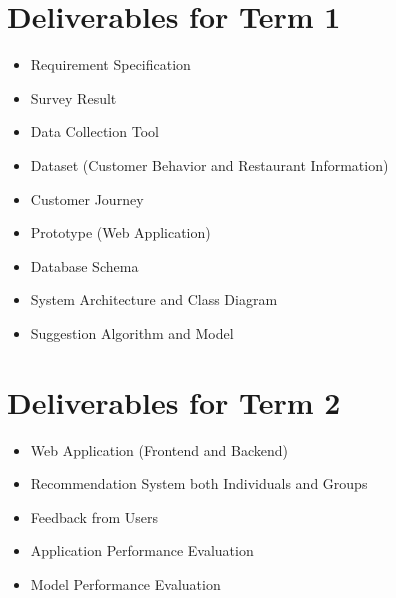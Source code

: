 \documentclass[12pt,oneside,openright,a4paper]{cpe-english-project}
\begin{document}
\newpage

\section{Deliverables for Term 1} 
\begin{itemize}
\item Requirement Specification
\item Survey Result
\item Data Collection Tool
\item Dataset (Customer Behavior and Restaurant Information)
\item Customer Journey
\item Prototype (Web Application)
\item Database Schema
\item System Architecture and Class Diagram
\item Suggestion Algorithm and Model
\end{itemize}

\section{Deliverables for Term 2} 
\begin{itemize}
\item Web Application (Frontend and Backend)
\item Recommendation System both Individuals and Groups
\item Feedback from Users
\item Application Performance Evaluation
\item Model Performance Evaluation
\end{itemize}
\end{document}
